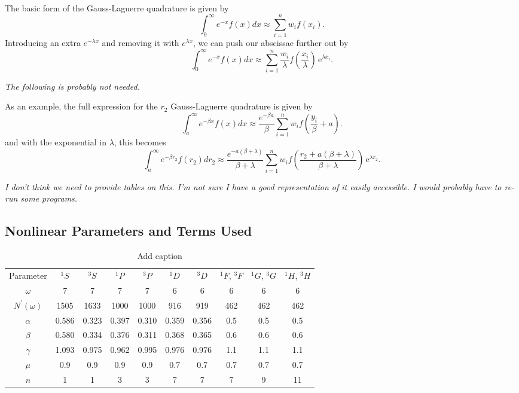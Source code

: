 \documentclass[preprint,showpacs,preprintnumbers,amsmath,amssymb]{revtex4}
\newcommand{\ee} {\,\text{e}}
\newcommand{\beq}{\begin{equation}}
\newcommand{\eeq}{\end{equation}}
\begin{document}
The basic form of the Gauss-Laguerre quadrature is given by \cite{??}
\beq
\label{eq:GaussLag}
\int_0^\infty e^{-x} f(x) dx \approx \sum_{i=1}^n w_i f(x_i).
\eeq
Introducing an extra $e^{-\lambda x}$ and removing it with $e^{\lambda x}$, we can push our abscissae further out by
\beq
\label{eq:GaussLagLambda}
\int_0^\infty e^{-x} f(x) dx \approx \sum_{i=1}^n \frac{w_i}{\lambda} f\! \left(\frac{x_i}{\lambda}\right) \ee^{\lambda x_i}.
\eeq

\emph{The following is probably not needed.}

As an example, the full expression for the $r_2$ Gauss-Laguerre quadrature is given by
\beq
\int_a^\infty e^{-\beta x} f(x) dx \approx \frac{e^{-\beta a}}{\beta} \sum_{i=1}^n w_i f\left(\frac{y_i}{\beta}+a\right).
\eeq
and with the exponential in $\lambda$, this becomes
\beq
\int_a^\infty e^{-\beta r_2} f(r_2) dr_2 \approx \frac{e^{-a (\beta + \lambda)}}{\beta + \lambda} \sum_{i=1}^n w_i f\left(\frac{r_2 + a(\beta + \lambda)}{\beta + \lambda} \right) \ee^{\lambda r_2}.
\eeq

\emph{I don't think we need to provide tables on this. I'm not sure I have a good representation of it easily accessible. I would probably have to re-run some programs.}


\subsection{Nonlinear Parameters and Terms Used}
\begin{table}[H]
  \centering
	\begin{ruledtabular}
    \begin{tabular}{cccccccccc}
    Parameter & $^1S$ & $^3S$ & $^1P$ & $^3P$ & $^1D$ & $^3D$ & $^1F$, $^3F$ & $^1G$, $^3G$ & $^1H$, $^3H$ \\
    \colrule
		$\omega$ & 7 & 7 & 7 & 7 & 6 & 6 & 6 & 6 & 6 \\
		$N^\prime(\omega)$ & 1505 & 1633 & 1000 & 1000 & 916 & 919 & 462 & 462 & 462 \\
    $\alpha$ & 0.586 & 0.323 & 0.397 & 0.310 & 0.359 & 0.356 & 0.5   & 0.5   & 0.5 \\
    $\beta$ & 0.580 & 0.334 & 0.376 & 0.311 & 0.368 & 0.365 & 0.6   & 0.6   & 0.6 \\
    $\gamma$ & 1.093 & 0.975 & 0.962 & 0.995 & 0.976 & 0.976 & 1.1   & 1.1   & 1.1 \\
    $\mu$ & 0.9   & 0.9   & 0.9   & 0.9   & 0.7   & 0.7   & 0.7   & 0.7   & 0.7 \\
    $n$ & 1     & 1     & 3     & 3     & 7     & 7     & 7     & 9     & 11 \\
    \end{tabular}
	  \end{ruledtabular}
  \caption{Add caption}
  \label{tab:addlabel}%
\end{table}%
\end{document}
